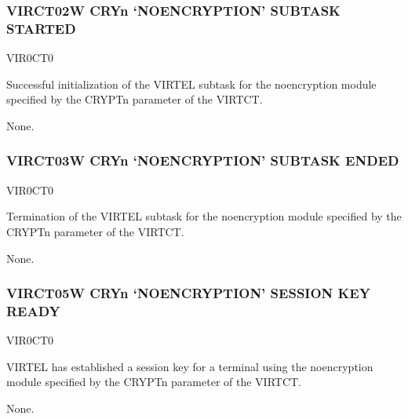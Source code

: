 \documentclass[letterpaper,10pt,english]{sphinxmanual}
\begin{document}
\subsubsection{VIRCT02W CRYn ‘NO\sphinxhyphen{}ENCRYPTION’ SUBTASK STARTED}
\label{\detokenize{messages:virct02w-cryn-no-encryption-subtask-started}}\begin{description}
\sphinxAtStartPar
VIR0CT0

\sphinxAtStartPar
Successful initialization of the VIRTEL subtask for the no\sphinxhyphen{}encryption module specified by the CRYPTn parameter of the VIRTCT.

\sphinxAtStartPar
None.

\end{description}


\subsubsection{VIRCT03W CRYn ‘NO\sphinxhyphen{}ENCRYPTION’ SUBTASK ENDED}
\label{\detokenize{messages:virct03w-cryn-no-encryption-subtask-ended}}\begin{description}
\sphinxAtStartPar
VIR0CT0

\sphinxAtStartPar
Termination of the VIRTEL subtask for the no\sphinxhyphen{}encryption module specified by the CRYPTn parameter of the VIRTCT.

\sphinxAtStartPar
None.

\end{description}


\subsubsection{VIRCT05W CRYn ‘NO\sphinxhyphen{}ENCRYPTION’ SESSION KEY READY}
\label{\detokenize{messages:virct05w-cryn-no-encryption-session-key-ready}}\begin{description}
\sphinxAtStartPar
VIR0CT0

\sphinxAtStartPar
VIRTEL has established a session key for a terminal using the no\sphinxhyphen{}encryption module specified by the CRYPTn parameter of the VIRTCT.

\sphinxAtStartPar
None.

\end{description}
\end{document}
